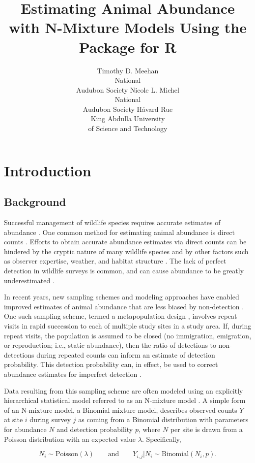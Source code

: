 \documentclass[article]{jss}
\author{Timothy D. Meehan\\National\\Audubon Society \And
        Nicole L. Michel\\National\\Audubon Society \And
        H{\aa}vard Rue\\King Abdulla University\\of Science and Technology}
\title{Estimating Animal Abundance with N-Mixture Models Using the \pkg{R-INLA} Package for R}
\begin{document}
\section[Introduction]{Introduction}
\subsection[Background]{Background}
Successful management of wildlife species requires accurate estimates of abundance \citep{Yoccoz_Nichols_Boulinier_2001}. One common method for estimating animal abundance is direct counts \citep{Pollock_Nichols_Simons_Farnsworth_Bailey_Sauer_2002}. Efforts to obtain accurate abundance estimates via direct counts can be hindered by the cryptic nature of many wildlife species and by other factors such as observer expertise, weather, and habitat structure \citep{Denes_Silveira_Beissinger_2015}. The lack of perfect detection in wildlife surveys is common, and can cause abundance to be greatly underestimated \citep{Wenger_Freeman_2008, Joseph_Elkin_Martin_Possingham_2009}.

In recent years, new sampling schemes and modeling approaches have enabled improved estimates of animal abundance that are less biased by non-detection \citep{Denes_Silveira_Beissinger_2015}. One such sampling scheme, termed a metapopulation design \citep{Kery_Royle_2010}, involves repeat visits in rapid succession to each of multiple study sites in a study area. If, during repeat visits, the population is assumed to be closed (no immigration, emigration, or reproduction; i.e., static abundance), then the ratio of detections to non-detections during repeated counts can inform an estimate of detection probability. This detection probability can, in effect, be used to correct abundance estimates for imperfect detection \citep{Royle_2004}.

Data resulting from this sampling scheme are often modeled using an explicitly hierarchical statistical model referred to as an N-mixture model \citep{Royle_Nichols_2003, Dodd_Dorazio_2004, Royle_2004, Kery_Royle_Schmid_2005}. A simple form of an N-mixture model, a Binomial mixture model, describes observed counts $Y$ at site $i$ during survey $j$ as coming from a Binomial distribution with parameters for abundance $N$ and detection probability $p$, where $N$ per site is drawn from a Poisson distribution with an expected value $\lambda$. Specifically,

$$N_i \sim \text{Poisson}(\lambda) \qquad \text{and} \qquad  Y_{i,j} | N_i \sim \text{Binomial}(N_i, p).$$
\end{document}
